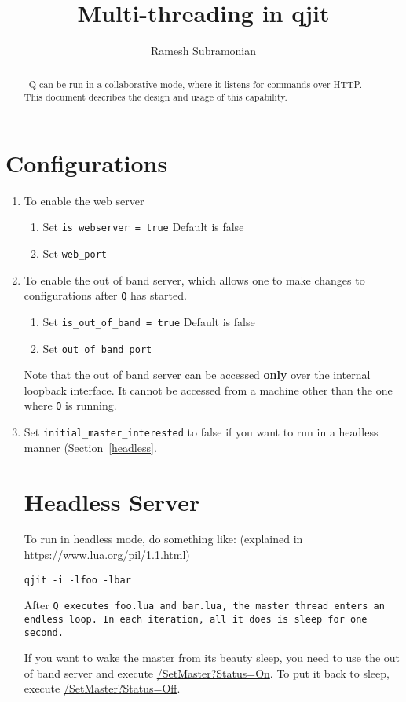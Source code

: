 \documentclass[letterpaper,12pt]{article}
\newcommand{\be}{\begin{enumerate}}
\newcommand{\ee}{\end{enumerate}}
\begin{document}
\title{Multi-threading in qjit}
\author{Ramesh Subramonian}
\maketitle
\thispagestyle{fancy}
\lhead{}
\chead{}
\rhead{}
\cfoot{}
\rfoot{{\small \thepage}}

 \begin{abstract}
\ Q can be run in a collaborative mode, where it listens for commands over
 HTTP. This document describes the design and usage of this capability.
\end{abstract}

\section{Configurations}

\be
\item To enable the web server
  \be 
\item Set \verb+is_webserver = true+  Default is false
\item Set \verb+web_port+
  \ee
\item To enable the out of band server, which allows one to 
  make changes to configurations after {\tt Q} has started.
  \be
\item 
  Set \verb+is_out_of_band = true+ Default is false
\item Set \verb+out_of_band_port+ 
  \ee
  Note that the out of band server can be accessed {\bf only} over the  internal loopback
  interface.
  It cannot be accessed from a machine other than the one where {\tt Q} is
  running.
\item Set \verb+initial_master_interested+ to false if you want to run in a
  headless manner (Section~\ref{headless}. 
  

\section{Headless Server}

To run in headless mode, do something like: (explained in
\url{https://www.lua.org/pil/1.1.html})
\begin{verbatim}
qjit -i -lfoo -lbar
\end{verbatim}

After \tt{Q} executes {\tt foo.lua} and {\tt bar.lua}, the master thread 
enters an endless loop. In each iteration, all it does is sleep for one  second.

If you want to wake the master from its beauty sleep, you need to use the out
of band server and execute \url{/SetMaster?Status=On}. To put it back to sleep,  
execute \url{/SetMaster?Status=Off}. 

\ee
\end{document}
